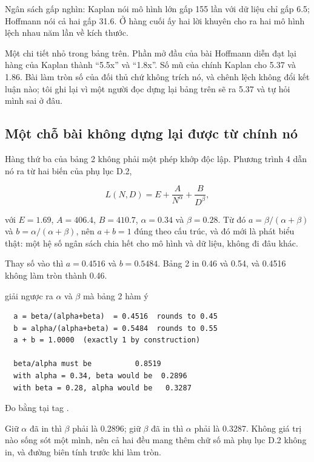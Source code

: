Ngân sách gấp nghìn: Kaplan nói mô hình lớn gấp 155 lần với dữ liệu chỉ gấp 6.5;
Hoffmann nói cả hai gấp 31.6. Ở hàng cuối ấy hai lời khuyên cho ra hai mô hình
lệch nhau năm lần về kích thước.

Một chi tiết nhỏ trong bảng trên. Phần mở đầu của bài Hoffmann diễn đạt lại
hàng  của Kaplan thành \enquote{5.5x} và \enquote{1.8x}. Số mũ của
chính Kaplan cho 5.37 và 1.86. Bài làm tròn số của đối thủ chứ không trích nó,
và chênh lệch không đổi kết luận nào; tôi ghi lại vì một người đọc dựng lại
bảng trên sẽ ra 5.37 và tự hỏi mình sai ở đâu.

\subsection*{Một chỗ bài không dựng lại được từ chính nó}

%
Hàng thứ ba của bảng 2 không phải một phép khớp độc lập. Phương trình 4 dẫn nó
ra từ  hai biến của phụ lục D.2,

\begin{equation}
\label{eq:ch09-chinchilla}
L(N, D) = E + \frac{A}{N^{\alpha}} + \frac{B}{D^{\beta}},
\end{equation}

với \(E = 1.69\), \(A = 406.4\), \(B = 410.7\), \(\alpha = 0.34\) và
\(\beta = 0.28\). Từ đó \(a = \beta/(\alpha + \beta)\) và
\(b = \alpha/(\alpha + \beta)\), nên \(a + b = 1\) đúng theo cấu trúc, và đó
mới là phát biểu thật: một hệ số ngân sách chia hết cho mô hình và dữ liệu,
không đi đâu khác.

Thay số vào thì \(a = 0.4516\) và \(b = 0.5484\). Bảng 2 in 0.46 và 0.54, và
0.4516 không làm tròn thành 0.46.

\begin{measured}{giải ngược ra \(\alpha\) và \(\beta\) mà bảng 2 hàm ý}
\begin{verbatim}
  a = beta/(alpha+beta)  = 0.4516  rounds to 0.45
  b = alpha/(alpha+beta) = 0.5484  rounds to 0.55
  a + b = 1.0000  (exactly 1 by construction)

  beta/alpha must be          0.8519
  with alpha = 0.34, beta would be  0.2896
  with beta = 0.28, alpha would be   0.3287
\end{verbatim}

Đo bằng  tại tag .
\end{measured}

Giữ \(\alpha\) đã in thì \(\beta\) phải là 0.2896; giữ \(\beta\) đã in thì
\(\alpha\) phải là 0.3287. Không giá trị nào sống sót một mình, nên cả hai đều
mang thêm chữ số mà phụ lục D.2 không in, và đường biên tính trước khi làm tròn.

